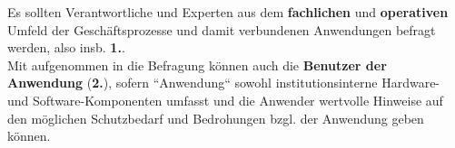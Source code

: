 \vspace{5mm}

\noindent
Es sollten Verantwortliche und Experten aus dem \textbf{fachlichen} und \textbf{operativen} Umfeld der Geschäftsprozesse und damit verbundenen Anwendungen befragt werden, also insb. \textbf{1.}.\\
Mit aufgenommen in die Befragung können auch die \textbf{Benutzer der Anwendung} (\textbf{2.}), sofern ``Anwendung`` sowohl institutionsinterne Hardware- und Software-Komponenten umfasst und die Anwender wertvolle Hinweise auf den möglichen Schutzbedarf und Bedrohungen bzgl. der Anwendung geben können.